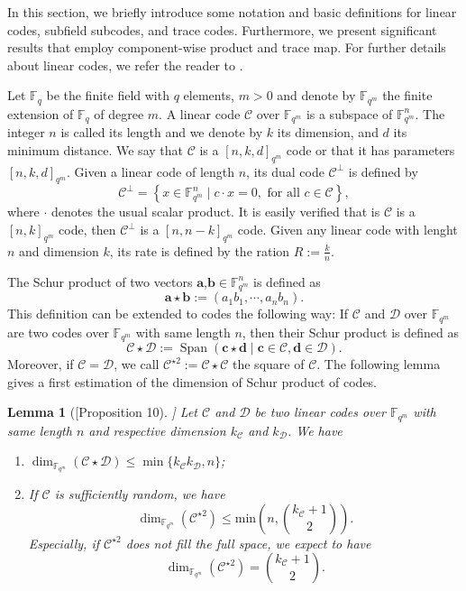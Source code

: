 \documentclass[a4paper]{article}
\newtheorem{lemma}[thm]{Lemma}
\theoremstyle{definition}
\theoremstyle{remark}
\newcommand{\calC}{\mathcal{C}}
\newcommand{\calD}{\mathcal{D}}
\newcommand{\fqm}{\mathbb{F}_{q^m}}
\newcommand{\fq}{\mathbb{F}_{q}}
\newcommand{\Span}[1]{\operatorname{Span}\left(#1\right)}
\newcommand\TODO[1]{\textcolor{red}{TO DO: #1}}
\begin{document}

In this section, we briefly introduce some notation and basic definitions for linear codes, subfield subcodes, and trace codes. Furthermore, we present significant results that employ component-wise product and trace map. For further details about linear codes, we refer the reader to \cite{MS86}.

\noindent Let $\fq$ be the finite field with $q$ elements, $m > 0$ and denote  by $\fqm$ the finite extension of $\fq$ of degree $m$. A linear code $\calC$ over $\fqm$ is a subspace of $\fqm^n$. The integer $n$ is called its length and we denote by $k$ its dimension, and $d$ its minimum distance. We say that $\calC$ is a $[n,k,d]_{q^m}$ code or that it has parameters $[n,k,d]_{q^m}$. Given a linear code of length $n$, its dual code $\calC^{\perp}$ is defined by 
\[\calC^{\perp}=\left\lbrace x \in \fqm^n \mid c \cdot x=0, \text{ for all } c \in \calC \right\rbrace,\]  
where $\cdot$ denotes the usual scalar product. It is easily verified that is $\calC$ is a $[n,k]_{q^m}$ code, then $\calC^{\perp}$ is a $[n,n-k]_{q^m}$ code.
Given any linear code with lenght $n$ and dimension $k$, its rate is defined by the ration $R := \frac{k}{n}$.

\noindent The Schur product of two vectors $\mathbf{a}$,$\mathbf{b} \in \fqm^n$ is defined as 
\[ \mathbf{a} \star \mathbf{b} := (a_1b_1,\cdots,a_nb_n). \]
This definition can be extended to codes the following way: If $\calC$ and $\calD$ over $\fqm$ are two codes over $\fqm$ with same length $n$, then their Schur product is defined as
\[ \calC \star \calD := \Span{\mathbf{c} \star \mathbf{d} \mid \mathbf{c} \in \calC, \mathbf{d} \in \calD}. \]
Moreover, if $\calC = \calD$, we call $\calC^{\star 2} := \calC \star \calC$ the square of $\calC$. The following lemma gives a first estimation of the dimension of Schur product of codes.

\begin{lemma}[\cite{MT21}[Proposition 10]] \label{lem:known_bounds}
Let $\calC$ and $\calD$ be two linear codes over $\fqm$ with same length $n$ and respective dimension $k_{\calC}$ and $k_{\calD}$. We have
\begin{enumerate}
	\item $\dim_{\fqm}(\calC \star \calD) \leq \min\{k_{\calC}k_{\calD},n\}$;
	\item If $\calC$ is sufficiently random, we have
\[ \dim_{\mathbb{F}_{q^m}}(\calC^{\star2}) \leq \mathrm{min}\left(n,\binom{k_{\calC}+1}{2}\right) . \]
Especially, if $\calC^{\star2}$ does not fill the full space, we expect to have 
	\[ \dim_{\fqm}(\calC^{\star2}) = \binom{k_{\calC}+1}{2}.\]
	\end{enumerate}
\end{lemma}
\end{document}
